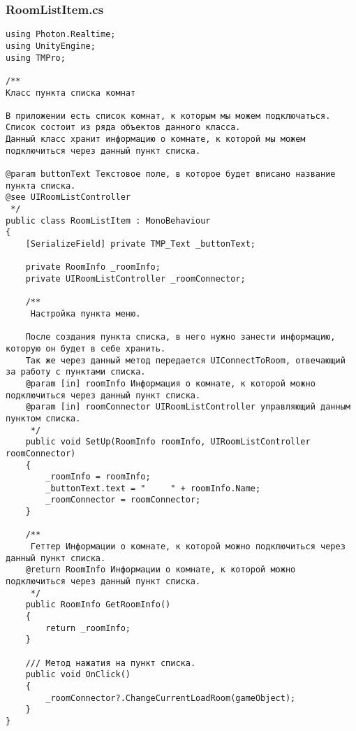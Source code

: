 \subsubsection*{RoomListItem.cs}
\begin{verbatim}
﻿using Photon.Realtime;
using UnityEngine;
using TMPro;

/**
Класс пункта списка комнат

В приложении есть список комнат, к которым мы можем подключаться. 
Список состоит из ряда объектов данного класса. 
Данный класс хранит информацию о комнате, к которой мы можем подключиться через данный пункт списка.

@param buttonText Текстовое поле, в которое будет вписано название пункта списка.
@see UIRoomListController
 */
public class RoomListItem : MonoBehaviour
{
    [SerializeField] private TMP_Text _buttonText;

    private RoomInfo _roomInfo;
    private UIRoomListController _roomConnector;

    /**
     Настройка пункта меню.

    После создания пункта списка, в него нужно занести информацию, которую он будет в себе хранить.
    Так же через данный метод передается UIConnectToRoom, отвечающий за работу с пунктами списка.
    @param [in] roomInfo Информация о комнате, к которой можно подключиться через данный пункт списка.
    @param [in] roomConnector UIRoomListController управляющий данным пунктом списка.
     */
    public void SetUp(RoomInfo roomInfo, UIRoomListController roomConnector)
    {
        _roomInfo = roomInfo;
        _buttonText.text = "     " + roomInfo.Name;
        _roomConnector = roomConnector;
    }

    /**
     Геттер Информации о комнате, к которой можно подключиться через данный пункт списка.
    @return RoomInfo Информации о комнате, к которой можно подключиться через данный пункт списка.
     */
    public RoomInfo GetRoomInfo()
    {
        return _roomInfo;
    }

    /// Метод нажатия на пункт списка.
    public void OnClick()
    {
        _roomConnector?.ChangeCurrentLoadRoom(gameObject);
    }
}

\end{verbatim}
